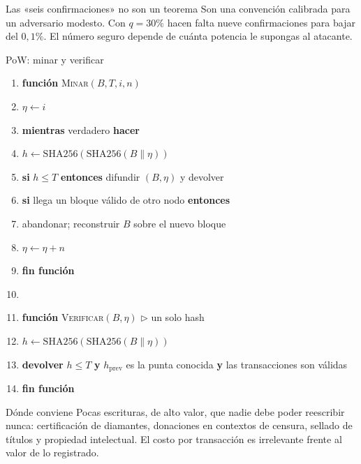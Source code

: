 \documentclass[11pt,a4paper]{article}
\theoremstyle{definition}
\theoremstyle{plain}
\theoremstyle{remark}
\begin{document}
\begin{aviso}{Las «seis confirmaciones» no son un teorema}
Son una convención calibrada para un adversario modesto. Con $q = 30\%$ hacen
falta nueve confirmaciones para bajar del $0{,}1\%$. El número seguro depende de
cuánta potencia le supongas al atacante.
\end{aviso}

\begin{algoritmo}{PoW: minar y verificar}
\begin{enumerate}[label=\arabic*:,leftmargin=2.6em,itemsep=0.05em,topsep=0.2em]
  \item \textbf{función} \textsc{Minar}$(B, T, i, n)$
  \item \quad $\eta \leftarrow i$
  \item \quad \textbf{mientras} verdadero \textbf{hacer}
  \item \quad\quad $h \leftarrow \mathrm{SHA256}(\mathrm{SHA256}(B \parallel \eta))$
  \item \quad\quad \textbf{si} $h \le T$ \textbf{entonces} difundir $(B,\eta)$ y devolver
  \item \quad\quad \textbf{si} llega un bloque válido de otro nodo \textbf{entonces}
  \item \quad\quad\quad abandonar; reconstruir $B$ sobre el nuevo bloque
  \item \quad\quad $\eta \leftarrow \eta + n$
  \item \textbf{fin función}
  \item[]
  \item \textbf{función} \textsc{Verificar}$(B,\eta)$ \hfill $\triangleright$ un solo hash
  \item \quad $h \leftarrow \mathrm{SHA256}(\mathrm{SHA256}(B \parallel \eta))$
  \item \quad \textbf{devolver} $h \le T$ \textbf{y} $h_{\text{prev}}$ es la punta conocida
        \textbf{y} las transacciones son válidas
  \item \textbf{fin función}
\end{enumerate}
\end{algoritmo}

\begin{caso}{Dónde conviene}
Pocas escrituras, de alto valor, que nadie debe poder reescribir nunca:
certificación de diamantes, donaciones en contextos de censura, sellado de
títulos y propiedad intelectual. El costo por transacción es irrelevante frente
al valor de lo registrado.
\end{caso}
\end{document}
